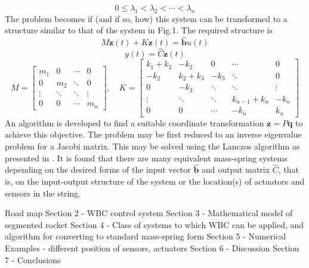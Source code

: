\documentclass{mbd_fullpaper}
\begin{document}
\begin{equation}
0 \leq \lambda_1<\lambda_2< \cdots <\lambda_n
\label{eq:lambda}
\end{equation}
The problem becomes if (and if so, how) this system can be transformed to a structure similar to that of the system in Fig.1.
The required structure is
\begin{equation}
M\ddot{\mathbf{z}}(t) + K\mathbf{z}(t) = \mathbf{\hat{b}}u(t)
\label{eq:eom1}
\end{equation}
\begin{equation}
y(t) = \hat{C} \mathbf{z}(t)
\label{eq:eom2}
\end{equation}
\begin{equation}
M = \begin{bmatrix}
m_1  &  0 & \cdots & 0 \\
0 & m_2  & \ddots & 0 \\
\vdots & \ddots & \ddots & \vdots \\
0 & 0 & \cdots & m_n \end{bmatrix}
, \quad
K = \begin{bmatrix}
k_1+k_2  &  -k_2 & 0 & \cdots & 0 \\
-k_2 & k_2+k_3  & -k_3 & \ddots & 0 \\
0 & -k_3 & \ddots & \ddots & \vdots \\
\vdots & \ddots & \ddots & k_{n-1}+k_n & -k_{n} \\
0 & 0 & \cdots & -k_{n} & k_n \end{bmatrix}
\end{equation}
An algorithm is developed to find a suitable coordinate transformation $\mathbf{z} = P \mathbf{q}$ to achieve this objective.
The problem may be first reduced to an inverse eigenvalue problem for a Jacobi matrix. This may be solved using the Lanczos algorithm as presented in \cite{gladwell1986inverse}. 
It is found that there are many equivalent mass-spring systems depending on the desired forms of the input vector $\hat{\mathbf{b}}$ and output matrix $\hat{C}$, that is, on the input-output structure of the system or the location(s) of actuators and sensors in the string.



Road map
Section 2 - WBC control system
Section 3 - Mathematical model of segmented rocket
Section 4 - Class of systems to which WBC can be applied, and algorithm for converting to standard mass-spring form
Section 5 - Numerical Examples - different position of sensors, actuators
Section 6 - Discussion
Section 7 - Conclusions 
\end{document}
